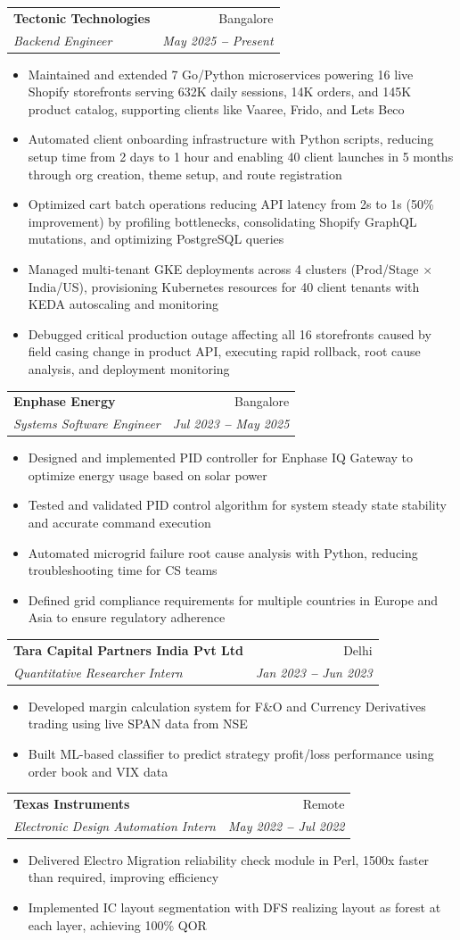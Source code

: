 \documentclass[letterpaper,11pt]{article}
\makeatletter
\newcommand{\resumeItem}[1]{
  \item\small{
    {#1 \vspace{-2pt}}
  }
}
\newcommand{\resumeSubheading}[4]{
  \vspace{-2pt}\item
    \begin{tabular*}{0.97\textwidth}[t]{l@{\extracolsep{\fill}}r}
      \textbf{#1} & #2 \\
      \textit{\small#3} & \textit{\small #4} \\
    \end{tabular*}\vspace{-7pt}
}
\newcommand{\resumeItemListStart}{\begin{itemize}}
\newcommand{\resumeItemListEnd}{\end{itemize}\vspace{-5pt}}
\makeatother
\begin{document}
    \resumeSubheading
      {Tectonic Technologies}{Bangalore}
      {Backend Engineer}{May 2025 \textbf{--} Present}
        \resumeItemListStart
            \resumeItem{Maintained and extended 7 Go/Python microservices powering 16 live Shopify storefronts serving 632K daily sessions, 14K orders, and 145K product catalog, supporting clients like Vaaree, Frido, and Lets Beco}
            \resumeItem{Automated client onboarding infrastructure with Python scripts, reducing setup time from 2 days to 1 hour and enabling 40 client launches in 5 months through org creation, theme setup, and route registration}
            \resumeItem{Optimized cart batch operations reducing API latency from 2s to 1s (50\% improvement) by profiling bottlenecks, consolidating Shopify GraphQL mutations, and optimizing PostgreSQL queries}
            \resumeItem{Managed multi-tenant GKE deployments across 4 clusters (Prod/Stage $\times$ India/US), provisioning Kubernetes resources for 40 client tenants with KEDA autoscaling and monitoring}
            \resumeItem{Debugged critical production outage affecting all 16 storefronts caused by field casing change in product API, executing rapid rollback, root cause analysis, and deployment monitoring}
        \resumeItemListEnd

    \resumeSubheading
      {Enphase Energy}{Bangalore}
      {Systems Software Engineer}{Jul 2023 \textbf{--} May 2025}
        \resumeItemListStart
            \resumeItem{Designed and implemented PID controller for Enphase IQ Gateway to optimize energy usage based on solar power}
            \resumeItem{Tested and validated PID control algorithm for system steady state stability and accurate command execution}
            \resumeItem{Automated microgrid failure root cause analysis with Python, reducing troubleshooting time for CS teams}
            \resumeItem{Defined grid compliance requirements for multiple countries in Europe and Asia to ensure regulatory adherence}
        \resumeItemListEnd

    \resumeSubheading
      {Tara Capital Partners India Pvt Ltd}{Delhi}
      {Quantitative Researcher Intern}{Jan 2023 \textbf{--} Jun 2023}
        \resumeItemListStart
            \resumeItem{Developed margin calculation system for F\&O and Currency Derivatives trading using live SPAN data from NSE}
            \resumeItem{Built ML-based classifier to predict strategy profit/loss performance using order book and VIX data}
        \resumeItemListEnd

    \resumeSubheading
      {Texas Instruments}{Remote}
      {Electronic Design Automation Intern}{May 2022 \textbf{--} Jul 2022}
        \resumeItemListStart
            \resumeItem{Delivered Electro Migration reliability check module in Perl, 1500x faster than required, improving efficiency}
            \resumeItem{Implemented IC layout segmentation with DFS realizing layout as forest at each layer, achieving 100\% QOR}
        \resumeItemListEnd
\end{document}
